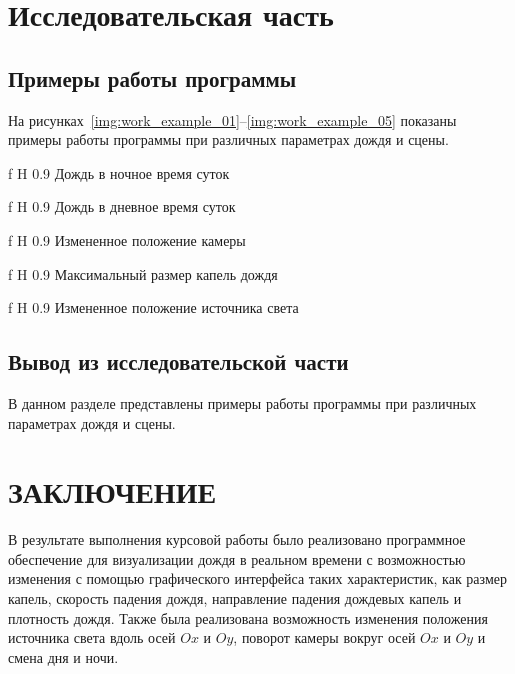 \chapter{Исследовательская часть}

\section*{Примеры работы программы}

На рисунках~\ref{img:work_example_01}--\ref{img:work_example_05} показаны примеры работы программы при различных параметрах дождя и сцены.

    {f}
    {H}
    {0.9\textwidth}
    {Дождь в ночное время суток}
    
    {f}
    {H}
    {0.9\textwidth}
    {Дождь в дневное время суток}
    
    {f}
    {H}
    {0.9\textwidth}
    {Измененное положение камеры}
    
    {f}
    {H}
    {0.9\textwidth}
    {Максимальный размер капель дождя}
    
    {f}
    {H}
    {0.9\textwidth}
    {Измененное положение источника света}

\section*{Вывод из исследовательской части}

В данном разделе представлены примеры работы программы при различных параметрах дождя и сцены. 

{\centering \chapter*{ЗАКЛЮЧЕНИЕ}}

В результате выполнения курсовой работы было реализовано программное обеспечение для визуализации дождя в реальном времени с возможностью изменения с помощью графического интерфейса таких характеристик, как размер капель, скорость падения дождя, направление падения дождевых капель и плотность дождя. 
Также была реализована возможность изменения положения источника света вдоль осей $Ox$ и $Oy$, поворот камеры вокруг осей $Ox$ и $Oy$ и смена дня и ночи.


